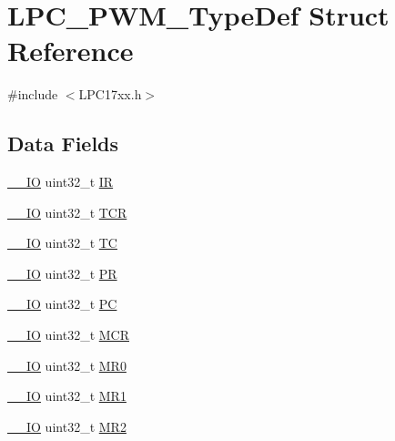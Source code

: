 \hypertarget{structLPC__PWM__TypeDef}{}\section{L\+P\+C\+\_\+\+P\+W\+M\+\_\+\+Type\+Def Struct Reference}
\label{structLPC__PWM__TypeDef}


{\ttfamily \#include $<$L\+P\+C17xx.\+h$>$}

\subsection*{Data Fields}
\begin{DoxyCompactItemize}
\item 
\hyperlink{LPC17xx_8h_aec43007d9998a0a0e01faede4133d6be}{\+\_\+\+\_\+\+IO} uint32\+\_\+t \hyperlink{structLPC__PWM__TypeDef_a9811eb5738e52f3b1a11ddff49bbdc78}{IR}
\item 
\hyperlink{LPC17xx_8h_aec43007d9998a0a0e01faede4133d6be}{\+\_\+\+\_\+\+IO} uint32\+\_\+t \hyperlink{structLPC__PWM__TypeDef_a9b55e114f9f96123677ed8a89d147be7}{T\+CR}
\item 
\hyperlink{LPC17xx_8h_aec43007d9998a0a0e01faede4133d6be}{\+\_\+\+\_\+\+IO} uint32\+\_\+t \hyperlink{structLPC__PWM__TypeDef_addc3a8bbc412879ee9681c28d2b2ef5c}{TC}
\item 
\hyperlink{LPC17xx_8h_aec43007d9998a0a0e01faede4133d6be}{\+\_\+\+\_\+\+IO} uint32\+\_\+t \hyperlink{structLPC__PWM__TypeDef_a7b4fe1c22c66694348c1e75dd817afd6}{PR}
\item 
\hyperlink{LPC17xx_8h_aec43007d9998a0a0e01faede4133d6be}{\+\_\+\+\_\+\+IO} uint32\+\_\+t \hyperlink{structLPC__PWM__TypeDef_afc34e1b610676c8cf5255efe1faf2770}{PC}
\item 
\hyperlink{LPC17xx_8h_aec43007d9998a0a0e01faede4133d6be}{\+\_\+\+\_\+\+IO} uint32\+\_\+t \hyperlink{structLPC__PWM__TypeDef_a0c3e4663051f5c6885cb8562346aa282}{M\+CR}
\item 
\hyperlink{LPC17xx_8h_aec43007d9998a0a0e01faede4133d6be}{\+\_\+\+\_\+\+IO} uint32\+\_\+t \hyperlink{structLPC__PWM__TypeDef_a58251279238261260aeba4cdfb095015}{M\+R0}
\item 
\hyperlink{LPC17xx_8h_aec43007d9998a0a0e01faede4133d6be}{\+\_\+\+\_\+\+IO} uint32\+\_\+t \hyperlink{structLPC__PWM__TypeDef_a3ff2ff273b161855cf4f35d198267a04}{M\+R1}
\item 
\hyperlink{LPC17xx_8h_aec43007d9998a0a0e01faede4133d6be}{\+\_\+\+\_\+\+IO} uint32\+\_\+t \hyperlink{structLPC__PWM__TypeDef_ae229456aab8044466975b2e46ae1a6a7}{M\+R2}

\end{DoxyCompactItemize}
